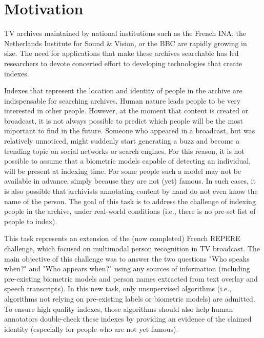 \documentclass{acm_proc_article-me}
\begin{document}
\maketitle
\begin{abstract}

\end{abstract}

\section{Motivation}

TV archives maintained by national institutions such as the French INA, the Netherlands Institute for Sound \& Vision, or the BBC are rapidly growing in size. The need for applications that make these archives searchable has led researchers to devote concerted effort to developing technologies that create indexes.

Indexes that represent the location and identity of people in the archive are indispensable for searching archives. Human nature leads people to be very interested in other people. However, at the moment that content is created or broadcast, it is not always possible to predict which people will be the most important to find in the future. Someone who appeared in a broadcast, but was relatively unnoticed, might suddenly start generating a buzz and become a trending topic on social networks or search engines. For this reason, it is not possible to assume that a biometric models capable of detecting an individual, will be present at indexing time. For some people such a model may not be available in advance, simply because they are not (yet) famous. In such cases, it is also possible that archivists annotating content by hand do not even know the name of the person. The goal of this task is to address the challenge of indexing people in the archive, under real-world conditions (i.e., there is no pre-set list of people to index). 

This task represents an extension of the (now completed) French REPERE challenge, which focused on multimodal person recognition in TV broadcast. The main objective of this challenge was to answer the two questions "Who speaks when?" and "Who appears when?" using any sources of information (including pre-existing biometric models and person names extracted from text overlay and speech transcripts). In this new task, only unsupervised algorithms (i.e., algorithms not relying on pre-existing labels or biometric models) are admitted. To ensure high quality indexes, those algorithms should also help human annotators double-check these indexes by providing an evidence of the claimed identity (especially for people who are not yet famous).
\end{document}
